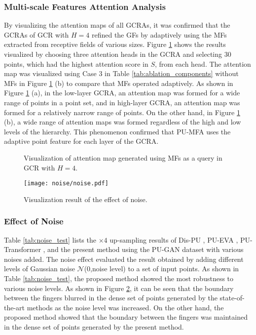 \documentclass{article}
\begin{document}
\subsubsection{Multi-scale Features Attention Analysis}
\quad By visualizing the attention maps of all GCRAs, it was confirmed that the GCRAs of GCR with $H=4$ refined the GFs by adaptively using the MFs extracted from receptive fields of various sizes. Figure \ref{fig:attention_map} shows the results visualized by choosing three attention heads in the GCRA and selecting 30 points, which had the highest attention score in $S$, from each head. The attention map was visualized using Case 3 in Table \ref{tab:ablation_components} without MFs in Figure \ref{fig:attention_map} (b) to compare that MFs operated adaptively. As shown in Figure \ref{fig:attention_map} (a), in the low-layer GCRA, an attention map was formed for a wide range of points in a point set, and in high-layer GCRA, an attention map was formed for a relatively narrow range of points. On the other hand, in Figure \ref{fig:attention_map} (b), a wide range of attention maps was formed regardless of the high and low levels of the hierarchy. This phenomenon confirmed that PU-MFA uses the adaptive point feature for each layer of the GCRA.

\begin{figure}[htb!]
  \centering
  
  \caption{Visualization of attention map generated using MFs as a query in GCR with $H=4$.}
    \label{fig:attention_map}
\end{figure}

\begin{figure}[htb!]
  \centering
\texttt{[image: noise/noise.pdf]} 
  \caption{Visualization result of the effect of noise.}
    \label{fig:noisy_quality}
\end{figure}

\subsubsection{Effect of Noise}
\quad Table \ref{tab:noise_test} lists the $\times 4$ up-sampling results of Dis-PU \cite{li2021point}, PU-EVA \cite{luo2021pu}, PU-Transformer \cite{qiu2021pu}, and the present method using the PU-GAN dataset with various noises added. The noise effect evaluated the result obtained by adding different levels of Gaussian noise $\mathcal{N}$(0,noise level) to a set of input points. As shown in Table \ref{tab:noise_test}, the proposed method showed the most robustness to various noise levels. As shown in Figure \ref{fig:noisy_quality}, it can be seen that the boundary between the fingers blurred in the dense set of points generated by the state-of-the-art methods as the noise level was increased. On the other hand, the proposed method showed that the boundary between the fingers was maintained in the dense set of points generated by the present method.
\end{document}

